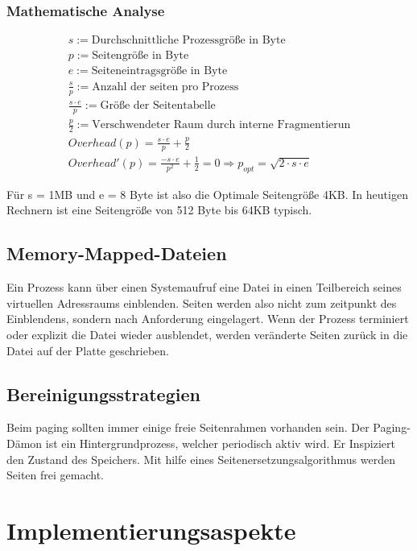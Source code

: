 \subsubsection*{Mathematische Analyse}

\begin{align*}
    s := \text{Durchschnittliche Prozessgröße in Byte} \\
    p := \text{Seitengröße in Byte} \\
    e := \text{Seiteneintragsgröße in Byte} \\
    \frac{s}{p} := \text{Anzahl der seiten pro Prozess} \\
    \frac{s \cdot e}{p} := \text{Größe der Seitentabelle} \\
    \frac{p}{2} := \text{Verschwendeter Raum durch interne Fragmentierun} \\
    Overhead(p) = \frac{s \cdot e}{p} + \frac{p}{2} \\
    Overhead'(p) = \frac{- s \cdot e}{p^2} + \frac{1}{2} = 0 \Rightarrow p_{opt} = \sqrt{2 \cdot s \cdot e}
\end{align*}

Für s = 1MB und e = 8 Byte ist also die Optimale Seitengröße 4KB. In heutigen Rechnern ist eine Seitengröße von 512 Byte bis 64KB typisch.

\subsection{Memory-Mapped-Dateien}

Ein Prozess kann über einen Systemaufruf eine Datei in einen Teilbereich seines virtuellen Adressraums einblenden. Seiten werden also nicht zum zeitpunkt des Einblendens, sondern nach Anforderung eingelagert.  Wenn der Prozess terminiert oder explizit die Datei wieder ausblendet, werden veränderte Seiten zurück in die Datei auf der Platte geschrieben.

\subsection{Bereinigungsstrategien}

Beim paging sollten immer einige freie Seitenrahmen vorhanden sein. Der Paging-Dämon ist ein Hintergrundprozess, welcher periodisch aktiv wird. Er Inspiziert den Zustand des Speichers. Mit hilfe eines Seitenersetzungsalgorithmus werden Seiten frei gemacht.

\pagebreak

\section{Implementierungsaspekte}

